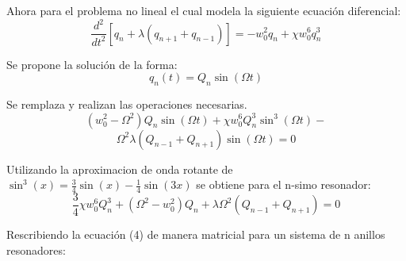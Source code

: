 \documentclass[11pt,letterpaper,twocolumn]{article}
\begin{document}
Ahora para el problema no lineal el cual modela la siguiente ecuación diferencial:
\begin{equation}
\frac { { d }^{ 2 } }{ d{ t }^{ 2 } } \left[ { q }_{ n }+\lambda \left( { q }_{ n+1 }+{ q }_{ n-1 } \right) \right]=-{ w }_{ 0 }^{ 2 }{ q }_{ n }+\chi{ w }_{ 0 }^{ 6 }{ q }_{ n }^{ 3 }
\end{equation}

Se propone la solución de la forma:
$$ { q }_{ n }\left( t \right) ={ Q }_{ n }\sin { \left( \Omega t \right)  } $$

Se remplaza y realizan las operaciones necesarias.
$$\left( { w }_{ 0 }^{ 2 }-{ \Omega  }^{ 2 } \right) { Q }_{ n }\sin { \left( \Omega t \right) +\chi { w }_{ 0 }^{ 6 } } { { Q }_{ n }^{ 3 } }\sin ^{ 3 } \left( \Omega t \right) -$$
$${ \Omega  }^{ 2 }\lambda \left( { Q }_{ n-1 }+{ Q }_{ n+1 } \right) \sin  \left( \Omega t \right) =0 $$

\par
Utilizando la aproximacion de onda rotante de $\sin^{3}(x)=\frac{3}{4}\sin(x)-\frac{1}{4}\sin(3x)$ se obtiene para el n-simo resonador:
\begin{equation}
\frac{3}{4}\chi w_{0}^{6}Q_{n}^{3}+\left(\Omega^{2}-w_{0}^{2}\right)Q_{n}+\lambda\Omega^{2}\left(Q_{n-1}+Q_{n+1}\right)=0
\end{equation}

Rescribiendo la ecuación (4) de manera matricial para un sistema de n anillos resonadores:
\end{document}
